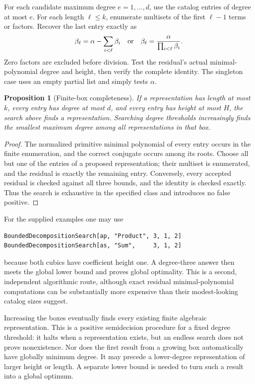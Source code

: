 \documentclass[11pt,letterpaper]{article}
\newtheorem{proposition}[theorem]{Proposition}
\theoremstyle{definition}
\theoremstyle{remark}
\begin{document}
For each candidate maximum degree \(e=1,\ldots,d\), use the catalog
entries of degree at most \(e\). For each length \(\ell\leq k\),
enumerate multisets of the first \(\ell-1\) terms or factors. Recover the
last entry exactly as
\[
 \beta_\ell=\alpha-\sum_{i<\ell}\beta_i
 \quad\hbox{or}\quad
 \beta_\ell=\frac{\alpha}{\prod_{i<\ell}\beta_i}.
\]
Zero factors are excluded before division. Test the residual's actual
minimal-polynomial degree and height, then verify the complete identity.
The singleton case uses an empty partial list and simply tests \(\alpha\).

\begin{proposition}[Finite-box completeness]\label{prop:bounded}
If a representation has length at most \(k\), every entry has degree at
most \(d\), and every entry has height at most \(H\), the search above
finds a representation. Searching degree thresholds increasingly finds
the smallest maximum degree among all representations in that box.
\end{proposition}
\begin{proof}
The normalized primitive minimal polynomial of every entry occurs in the
finite enumeration, and the correct conjugate occurs among its roots.
Choose all but one of the entries of a proposed representation; their
multiset is enumerated, and the residual is exactly the remaining entry.
Conversely, every accepted residual is checked against all three bounds,
and the identity is checked exactly. Thus the search is exhaustive in the
specified class and introduces no false positive.
\end{proof}
For the supplied examples one may use
\begin{lstlisting}
BoundedDecompositionSearch[ap, "Product", 3, 1, 2]
BoundedDecompositionSearch[as, "Sum",     3, 1, 2]
\end{lstlisting}
because both cubics have coefficient height one. A degree-three answer then
meets the global lower bound and proves global optimality. This is a second,
independent algorithmic route, although exact residual minimal-polynomial
computations can be substantially more expensive than their modest-looking
catalog sizes suggest.

Increasing the boxes eventually finds every existing finite algebraic
representation. This is a positive semidecision procedure for a fixed
degree threshold: it halts when a representation exists, but an endless
search does not prove nonexistence. Nor does the first result from a growing
box automatically have globally minimum degree. It may precede a
lower-degree representation of larger height or length. A separate lower
bound is needed to turn such a result into a global optimum.
\end{document}
